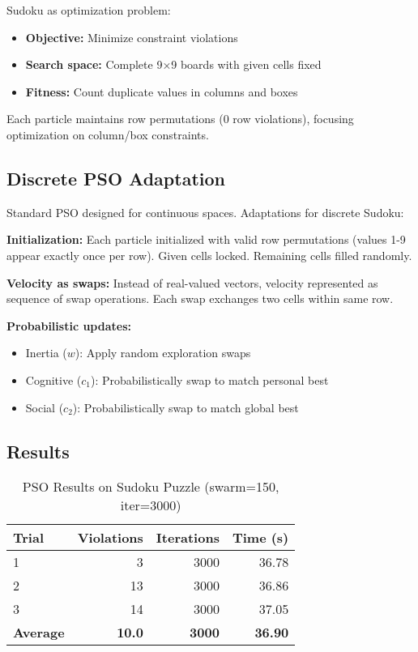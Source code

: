 \documentclass[letterpaper]{article}
\begin{document}
Sudoku as optimization problem:
\begin{itemize}
\item \textbf{Objective:} Minimize constraint violations
\item \textbf{Search space:} Complete 9×9 boards with given cells fixed
\item \textbf{Fitness:} Count duplicate values in columns and boxes
\end{itemize}

Each particle maintains row permutations (0 row violations), focusing optimization on column/box constraints.

\subsection{Discrete PSO Adaptation}

Standard PSO designed for continuous spaces. Adaptations for discrete Sudoku:

\textbf{Initialization:} Each particle initialized with valid row permutations (values 1-9 appear exactly once per row). Given cells locked. Remaining cells filled randomly.

\textbf{Velocity as swaps:} Instead of real-valued vectors, velocity represented as sequence of swap operations. Each swap exchanges two cells within same row.

\textbf{Probabilistic updates:}
\begin{itemize}
\item Inertia ($w$): Apply random exploration swaps
\item Cognitive ($c_1$): Probabilistically swap to match personal best
\item Social ($c_2$): Probabilistically swap to match global best
\end{itemize}

\subsection{Results}

\begin{table}[h]
\centering
\caption{PSO Results on Sudoku Puzzle (swarm=150, iter=3000)}
\label{tab:pso-sudoku}
\begin{tabular}{@{}lrrr@{}}
\toprule
\textbf{Trial} & \textbf{Violations} & \textbf{Iterations} & \textbf{Time (s)} \\
\midrule
1 & 3 & 3000 & 36.78 \\
2 & 13 & 3000 & 36.86 \\
3 & 14 & 3000 & 37.05 \\
\midrule
\textbf{Average} & \textbf{10.0} & \textbf{3000} & \textbf{36.90} \\
\bottomrule
\end{tabular}
\end{table}
\end{document}
